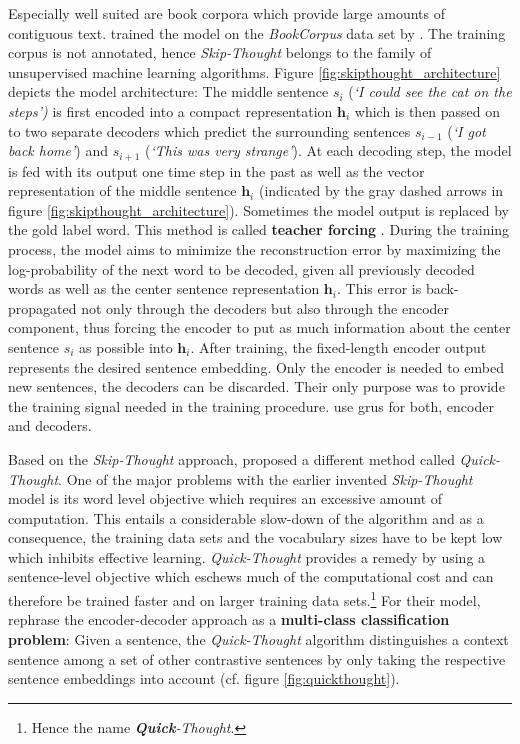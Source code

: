 Especially well suited are book corpora which provide large amounts of contiguous text. \citep{Kiros.2015} trained the model on the \textit{BookCorpus} data set by \citep{Zhu.2015}. The training corpus is not annotated, hence \textit{Skip-Thought} belongs to the family of unsupervised machine learning algorithms. Figure \vref{fig:skipthought_architecture} depicts the model architecture: The middle sentence $s_i$ (\textit{`I could see the cat on the steps')} is first encoded into a compact representation $\bm{h}_i$ which is then passed on to two separate decoders which predict the surrounding sentences $s_{i-1}$ (\textit{`I got back home'}) and $s_{i+1}$ (\textit{`This was very strange'}). At each decoding step, the model is fed with its output one time step in the past as well as the vector representation of the middle sentence $\bm{h}_i$ (indicated by the gray dashed arrows in figure \vref{fig:skipthought_architecture}). Sometimes the model output is replaced by the gold label word. This method is called \textbf{teacher forcing} \citep{Williams.1998}. During the training process, the model aims to minimize the reconstruction error by maximizing the log-probability of the next word to be decoded, given all previously decoded words as well as the center sentence representation $\bm{h}_i$. This error is back-propagated not only through the decoders but also through the encoder component, thus forcing the encoder to put as much information about the center sentence $s_i$ as possible into $\bm{h}_i$. After training, the fixed-length encoder output represents the desired sentence embedding. Only the encoder is needed to embed new sentences, the decoders can be discarded. Their only purpose was to provide the training signal needed in the training procedure. \citep{Kiros.2015} use \glspl{gru} \citep{Chung.2014} for both, encoder and decoders.



 Based on the \textit{Skip-Thought} approach, \citep{Logeswaran.2018} proposed a different method called \textit{Quick-Thought}. One of the major problems with the earlier invented \textit{Skip-Thought} model is its word level objective which requires an excessive amount of computation. This entails a considerable slow-down of the algorithm and as a consequence, the training data sets and the vocabulary sizes have to be kept low which inhibits effective learning. \textit{Quick-Thought} provides a remedy by using a sentence-level objective which eschews much of the computational cost and can therefore be trained faster and on larger training data sets.\footnote{Hence the name \textit{\textbf{Quick}-Thought}.} For their model, \citep{Logeswaran.2018} rephrase the encoder-decoder approach as a \textbf{multi-class classification problem}: Given a sentence, the \textit{Quick-Thought} algorithm distinguishes a context sentence among a set of other contrastive sentences by only taking the respective sentence embeddings into account (cf. figure \vref{fig:quickthought}).


